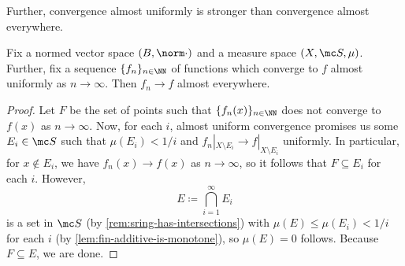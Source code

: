 \documentclass[../notes.tex]{subfiles}
\begin{document}
Further, convergence almost uniformly is stronger than convergence almost everywhere.
\begin{lemma} \label{lem:almost-uniform-to-almost-everywhere}
	Fix a normed vector space $(B,\norm\cdot)$ and a measure space $(X,\mc S,\mu)$. Further, fix a sequence $\{f_n\}_{n\in\NN}$ of functions which converge to $f$ almost uniformly as $n\to\infty$. Then $f_n\to f$ almost everywhere.
\end{lemma}
\begin{proof}
	Let $F$ be the set of points such that $\{f_n(x)\}_{n\in\NN}$ does not converge to $f(x)$ as $n\to\infty$. Now, for each $i$, almost uniform convergence promises us some $E_i\in\mc S$ such that $\mu(E_i)<1/i$ and $f_n|_{X\setminus E_i}\to f|_{X\setminus E_i}$ uniformly. In particular, for $x\notin E_i$, we have $f_n(x)\to f(x)$ as $n\to\infty$, so it follows that $F\subseteq E_i$ for each $i$. However,
	\[E\coloneqq\bigcap_{i=1}^\infty E_i\]
	is a set in $\mc S$ (by \autoref{rem:sring-has-intersections}) with $\mu(E)\le\mu(E_i)<1/i$ for each $i$ (by \autoref{lem:fin-additive-is-monotone}), so $\mu(E)=0$ follows. Because $F\subseteq E$, we are done.
\end{proof}
\end{document}
